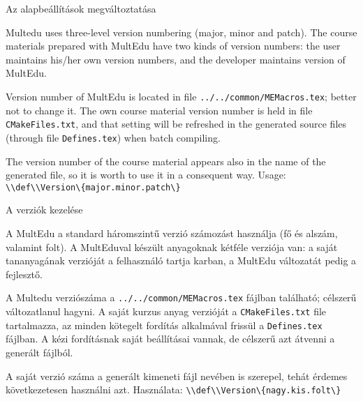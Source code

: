 
{
}
{Az alapbeállítások megváltoztatása}
{
}


{
Multedu uses three-level version numbering (major, minor and patch).
The course materials prepared with MultEdu have two kinds of version numbers: the user maintains his/her own version numbers, and the 
developer maintains version of MultEdu. 

Version number of MultEdu is located in file  \lstinline|../../common/MEMacros.tex|; better not to change it.
The own course material version number is held in file \lstinline|CMakeFiles.txt|, and that setting will be refreshed 
in the generated source files (through file \lstinline|Defines.tex|) when batch compiling.

The version number of the course material appears also in the name
of the generated file, so it is worth to use it in a consequent way.
Usage:
\lstinline|\\def\\Version\{major.minor.patch\}|
}
{A verziók kezelése}
{
A MultEdu a standard háromszintű verzió számozást használja (fő és alszám, valamint folt). A MultEduval készült anyagoknak kétféle 
verziója van: a saját tananyagának verzióját a felhasználó tartja karban, a MultEdu változatát pedig a fejlesztő.

A Multedu verziószáma a \lstinline|../../common/MEMacros.tex| fájlban található; célszerű változatlanul hagyni. 
A saját kurzus anyag verzióját a \lstinline|CMakeFiles.txt| file tartalmazza, az minden kötegelt fordítás alkalmával frissül a
\lstinline|Defines.tex| fájlban. A kézi fordításnak saját beállításai vannak, de célszerű azt átvenni a generált fájlból.

A saját verzió száma a generált kimeneti fájl nevében is szerepel,
tehát érdemes következetesen használni azt. Használata:
\lstinline|\\def\\Version\{nagy.kis.folt\}|
}


